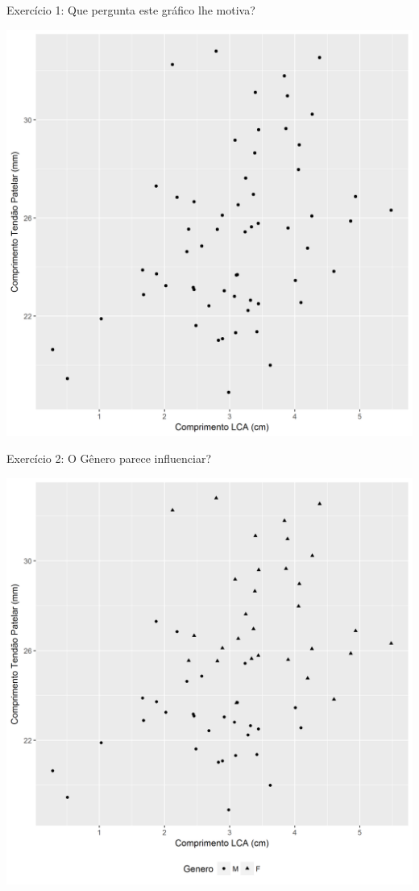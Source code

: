 \documentclass{beamer}
\begin{document}
\begin{frame}{\scriptsize Exercício 1: Que pergunta este gráfico lhe motiva?}
  \begin{center}
    \includegraphics[height=.9\textheight]{EDA/EDA-corr1}
  \end{center}
\end{frame}

\begin{frame}{\scriptsize Exercício 2: O Gênero parece influenciar?}
  \begin{center}
    \includegraphics[height=.9\textheight]{EDA/EDA-corr2}
  \end{center}
\end{frame}
\end{document}

